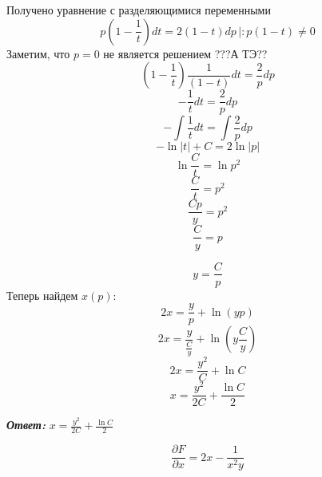 \documentclass[a5paper, 10pt]{article}
\theoremstyle{definition}
\theoremstyle{plain}
\theoremstyle{remark}
\begin{document}
Получено уравнение с разделяющимися переменными
\begin{equation*}
 p \left(1  - \frac{ 1}{t} \right) dt  = 2 (1  - t) dp \, \left| : p (1  - t) \neq 0 \right.
\end{equation*}
Заметим, что $p = 0$ не является решением ???А ТЭ??
\begin{equation*}
  \left(1  - \frac{ 1}{t} \right) \frac{1}{ (1  - t) } dt  =  \frac{2}{p} dp 
\end{equation*}
\begin{equation*}
 - \frac{1}{ t } dt  =  \frac{2}{p} dp 
\end{equation*}
\begin{equation*}
 - \int \frac{1}{ t } dt  = \int \frac{2}{p} dp 
\end{equation*}
\begin{equation*}
 - \ln | t| + C  = 2 \ln| p|
\end{equation*}
\begin{equation*}
 \ln \frac{C}{t}  =  \ln p^2
\end{equation*}
\begin{equation*}
  \frac{C}{t}  =   p^2
\end{equation*}
\begin{equation*}
  \frac{Cp}{y}  =   p^2
\end{equation*}
\begin{equation*}
  \frac{C}{y}  =   p
\end{equation*}

\begin{equation*}
 y   =   \frac{C}{p}
\end{equation*}
Теперь найдем $x(p)$:
\begin{equation*}
2x = \frac{y}{p} + \ln (yp)
\end{equation*}
\begin{equation*}
2x = \frac{ y}{ \frac{C}{y}} + \ln ( y  \frac{C}{y})
\end{equation*}
\begin{equation*}
2x = \frac{ y^2}{C} + \ln  C
\end{equation*}
\begin{equation*}
x = \frac{ y^2}{2C} +  \frac {\ln  C}{2}
\end{equation*}

\textit{\textbf{Ответ:}} $x = \frac{ y^2}{2C} +  \frac {\ln  C}{2}$


\begin{equation*}
\frac{\partial F}{\partial x} =  2x - \frac{1}{x^2y}
\end{equation*}
\end{document}
